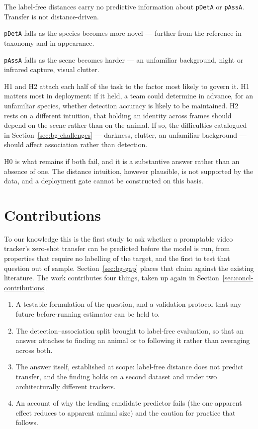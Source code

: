 \begin{description}[leftmargin=1.6em,style=unboxed,itemsep=2pt]
  \item[H0 (null)] The label-free distances carry no predictive information about \texttt{pDetA} or
    \texttt{pAssA}. Transfer is not distance-driven.
  \item[H1 (detection)] \texttt{pDetA} falls as the species becomes more novel --- further from the reference
    in taxonomy and in appearance.
  \item[H2 (association)] \texttt{pAssA} falls as the scene becomes harder --- an unfamiliar background, night
    or infrared capture, visual clutter.
\end{description}

H1 and H2 attach each half of the task to the factor most likely to govern it. H1 matters most in
deployment: if it held, a team could determine in advance, for an unfamiliar species, whether detection
accuracy is likely to be maintained. H2 rests on a different intuition, that holding an identity across
frames should depend on the scene rather than on the animal. If so, the difficulties catalogued in
Section~\ref{sec:bg-challenges} --- darkness, clutter, an unfamiliar background --- should affect
association rather than detection.

H0 is what remains if both fail, and it is a substantive answer rather than an absence of one. The distance
intuition, however plausible, is not supported by the data, and a deployment gate cannot be constructed on
this basis.

\section{Contributions}
To our knowledge this is the first study to ask whether a promptable video tracker's zero-shot transfer can
be predicted before the model is run, from properties that require no labelling of the target, and the first
to test that question out of sample. Section~\ref{sec:bg-gap} places that claim against the existing
literature. The work contributes four things, taken up again in Section~\ref{sec:concl-contributions}.

\begin{enumerate}[label=(\roman*),leftmargin=2.4em]
  \item A testable formulation of the question, and a validation protocol that any future before-running
    estimator can be held to.
  \item The detection--association split brought to label-free evaluation, so that an answer attaches to
    finding an animal or to following it rather than averaging across both.
  \item The answer itself, established at scope: label-free distance does not predict transfer, and the
    finding holds on a second dataset and under two architecturally different trackers.
  \item An account of why the leading candidate predictor fails (the one apparent effect reduces to
    apparent animal size) and the caution for practice that follows.
\end{enumerate}

